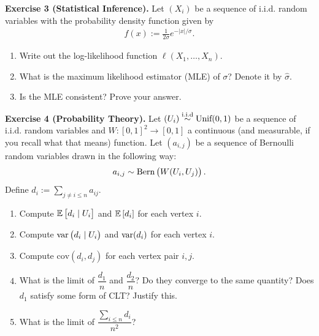\documentclass{article}
\begin{document}
\begin{tcolorbox}[colback = gray!16, enhanced, boxrule=0pt, frame hidden, sharp corners, borderline west={3pt}{-1.5pt}{black!80},breakable]
\textbf{Exercise 3 (Statistical Inference).} Let $(X_i)$ be a sequence of i.i.d. random variables with the probability density function given by 
\begin{align*}
    f(x) := \frac{1}{2\sigma}e^{-|x|/\sigma}.
\end{align*}
\begin{enumerate}[$(a)$]
    \item Write out the log-likelihood function $\ell(X_1, \hdots, X_n)$. 
    \item What is the maximum likelihood estimator (MLE) of $\sigma$? Denote it by $\hat\sigma$.
    \item Is the MLE consistent? Prove your answer.
\end{enumerate}
\end{tcolorbox}


\begin{tcolorbox}[colback = gray!16, enhanced, boxrule=0pt, frame hidden, sharp corners, borderline west={3pt}{-1.5pt}{black!80},breakable]
\textbf{Exercise 4 (Probability Theory).} Let $(U_i) \stackrel{\text{i.i.d}}{\sim} \text{Unif}(0, 1)$ be a sequence of i.i.d. random variables and $W : [0, 1]^2 \to [0,1]$ a continuous (and measurable, if you recall what that means) function. Let $(a_{i,j})$ be a sequence of Bernoulli random variables drawn in the following way:
\begin{align*}
    a_{i, j} \sim \text{Bern}\left(W(U_i, U_j)\right).
\end{align*}
Define $d_i := \sum_{j\neq i \leq n}a_{ij}$. 
\begin{enumerate}[$(a)$]
    \item Compute $\mathbb{E}\left[d_i \mid U_i\right]$ and $\mathbb{E}\left[d_i\right]$ for each vertex $i$.
    \item Compute $\text{var}\left(d_i \mid U_i\right)$ and $\text{var}(d_i)$ for each vertex $i$.
    \item Compute $\text{cov}(d_i, d_j)$ for each vertex pair $i, j$.
    \item What is the limit of $\dfrac{d_1}{n}$ and $\dfrac{d_2}{n}$? Do they converge to the same quantity? Does $d_1$ satisfy some form of CLT? Justify this.
    \item What is the limit of $\dfrac{\sum_{i\leq n}d_i}{n^2}$?
\end{enumerate}
\end{tcolorbox}
\end{document}
